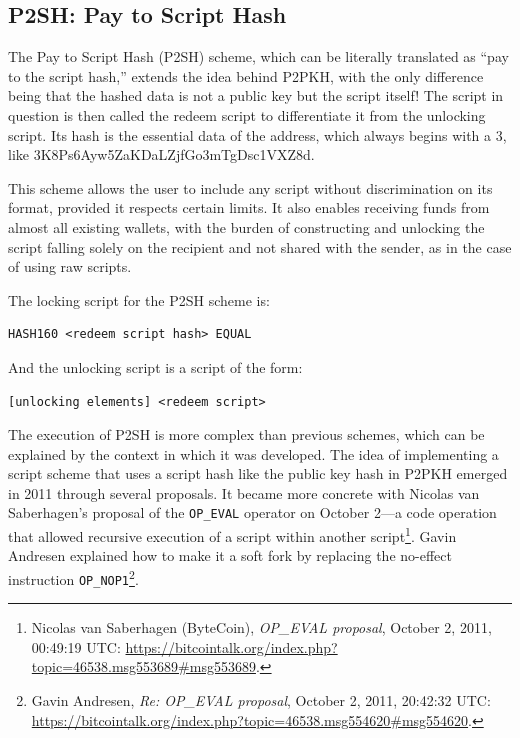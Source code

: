 \documentclass[
  a5paper,
  smalldemyvopaper,10pt,twoside,onecolumn,openright,extrafontsizes,hidelinks]{memoir}
\begin{document}
\subsection{P2SH: Pay to Script Hash}\label{p2sh-pay-to-script-hash}

The Pay to Script Hash (P2SH) scheme, which can be literally translated
as ``pay to the script hash,'' extends the idea behind P2PKH, with the
only difference being that the hashed data is not a public key but the
script itself! The script in question is then called the redeem script
to differentiate it from the unlocking script. Its hash is the essential
data of the address, which always begins with a 3, like
3K8Ps6Ayw5ZaKDaLZjfGo3mTgDsc1VXZ8d.

This scheme allows the user to include any script without discrimination
on its format, provided it respects certain limits. It also enables
receiving funds from almost all existing wallets, with the burden of
constructing and unlocking the script falling solely on the recipient
and not shared with the sender, as in the case of using raw scripts.

The locking script for the P2SH scheme is:

\begin{verbatim}
HASH160 <redeem script hash> EQUAL
\end{verbatim}

And the unlocking script is a script of the form:

\begin{verbatim}
[unlocking elements] <redeem script>
\end{verbatim}

The execution of P2SH is more complex than previous schemes, which can
be explained by the context in which it was developed. The idea of
implementing a script scheme that uses a script hash like the public key
hash in P2PKH emerged in 2011 through several proposals. It became more
concrete with Nicolas van Saberhagen's proposal of the \texttt{OP\_EVAL}
operator on October 2---a code operation that allowed recursive
execution of a script within another script\footnote{Nicolas van
  Saberhagen (ByteCoin), \emph{OP\_EVAL proposal}, October 2, 2011,
  00:49:19 UTC:
  \url{https://bitcointalk.org/index.php?topic=46538.msg553689\#msg553689}.}.
Gavin Andresen explained how to make it a soft fork by replacing the
no-effect instruction \texttt{OP\_NOP1}\footnote{Gavin Andresen,
  \emph{Re: OP\_EVAL proposal}, October 2, 2011, 20:42:32 UTC:
  \url{https://bitcointalk.org/index.php?topic=46538.msg554620\#msg554620}.}.
\end{document}
